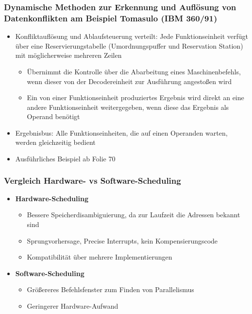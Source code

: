 \subsubsection{Dynamische Methoden zur Erkennung und Auflösung von Datenkonflikten am Beispiel Tomasulo (IBM 360/91)}
\begin{itemize}
	\item Konfliktauflösung und Ablaufsteuerung verteilt: Jede Funktionseinheit verfügt über eine Reservierungstabelle (Umordnungspuffer und Reservation Station) mit möglicherweise mehreren Zeilen
	\begin{itemize}
		\item Übernimmt die Kontrolle über die Abarbeitung eines Maschinenbefehls, wenn dieser von der Decodereinheit zur Ausführung angestoßen wird
		\item Ein von einer Funktionseinheit produziertes Ergebnis wird direkt an eine andere Funktionseinheit weitergegeben, wenn diese das Ergebnis als Operand benötigt
	\end{itemize}
	\item Ergebnisbus: Alle Funktionseinheiten, die auf einen Operanden warten, werden gleichzeitig bedient
	\item Ausführliches Beispiel ab Folie 70
\end{itemize}

\subsubsection{Vergleich Hardware- vs Software-Scheduling}
\begin{itemize}
	\item \textbf{Hardware-Scheduling}
	\begin{itemize}
		\item Bessere Speicherdisambiguierung, da zur Laufzeit die Adressen bekannt sind %
		\item Sprungvorhersage, Precise Interrupts, kein Kompensierungscode
		\item Kompatibilität über mehrere Implementierungen
	\end{itemize}
	\item \textbf{Software-Scheduling}
	\begin{itemize}
		\item Größereres Befehlsfenster zum Finden von Parallelismus
		\item Geringerer Hardware-Aufwand
	\end{itemize}
\end{itemize}

